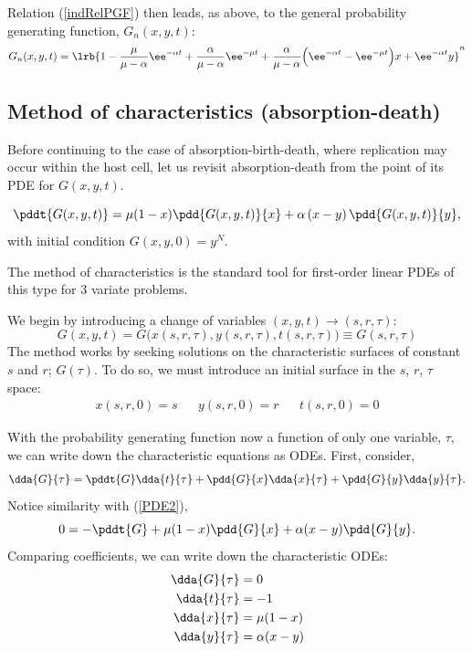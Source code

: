 \noindent
Relation (\ref{indRelPGF}) then leads, as above, to the general probability generating function, $G_n(x,y,t)$:
\begin{equation*}
G_n(x,y,t) = \lrb{1-\frac{\mu}{\mu - \alpha}  \ee^{-\alpha t}  + \frac{\alpha}{\mu - \alpha} \ee^{-\mu t}  + \frac{\alpha}{\mu - \alpha} \Big(   \ee^{-\alpha t} - \ee^{-\mu t} \Big)x +  \ee^{-\alpha t} y}^n
\end{equation*}




\subsection{Method of characteristics (absorption-death)}

Before continuing to the case of absorption-birth-death, where replication may occur within the host cell, let us revisit absorption-death from the point of its PDE for $G(x,y,t)$.

\begin{equation}
\label{PDE2b}
\pddt{G(x,y,t)} = \mu(1-x) \pdd{G(x,y,t)}{x}+\alpha\left(x - y\right) \pdd{G(x,y,t)}{y},
\end{equation}
with initial condition $G(x,y,0) = y^N$.

The method of characteristics is the standard tool for first-order linear PDEs of this type for 3 variate problems.\par
We begin by introducing a change of variables $(x,y,t) \to (s,r,\tau)$:
$$G(x,y,t) = G\big(x(s,r,\tau), y(s,r,\tau), t(s,r,\tau) \big) \equiv G(s,r,\tau)$$
The method works by seeking solutions on the characteristic surfaces of constant $s$ and $r$; $G(\tau)$. To do so, we must introduce an initial surface in the $s$, $r$, $\tau$ space:
\begin{align}
\label{ICpar}
x(s,r,0) = s && y(s,r,0) = r && t(s,r,0) = 0
\end{align}

With the probability generating function now a function of only one variable, $\tau$, we can write down the characteristic equations as ODEs. First, consider,
\begin{equation*}
\dda{G}{\tau} = \pddt{G} \dda{t}{\tau}  +  \pdd{G}{x}\dda{x}{\tau} + \pdd{G}{y}\dda{y}{\tau} .
\end{equation*}
Notice similarity with (\ref{PDE2}),
$$0  = -\pddt{G} + \mu(1-x)\pdd{G}{x} + \alpha (x-y)\pdd{G}{y}.$$
Comparing coefficients, we can write down the characteristic ODEs:
\begin{align}
\dda{G}{\tau} &= 0\label{ch11}\\
\dda{t}{\tau} &= -1\label{ch12}\\
\dda{x}{\tau} &= \mu(1-x)\label{ch13}\\
\dda{y}{\tau} &= \alpha(x-y)\label{ch14}
\end{align}


